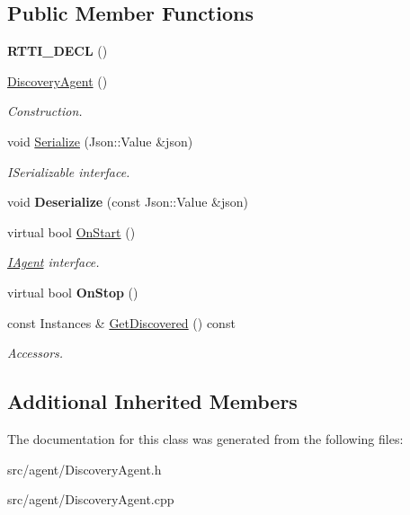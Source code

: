 \subsection*{Public Member Functions}
\begin{DoxyCompactItemize}
\item 
\mbox{\label{class_discovery_agent_a2588146e902e5d257ca271b069375f6b}} 
{\bfseries R\+T\+T\+I\+\_\+\+D\+E\+CL} ()
\item 
\mbox{\label{class_discovery_agent_a67363475dc274fd8b759f9a263077b24}} 
\hyperlink{class_discovery_agent_a67363475dc274fd8b759f9a263077b24}{Discovery\+Agent} ()
\begin{DoxyCompactList}\small\item\em Construction. \end{DoxyCompactList}\item 
\mbox{\label{class_discovery_agent_a50f62278b7937a8d6570def984a45f3e}} 
void \hyperlink{class_discovery_agent_a50f62278b7937a8d6570def984a45f3e}{Serialize} (Json\+::\+Value \&json)
\begin{DoxyCompactList}\small\item\em I\+Serializable interface. \end{DoxyCompactList}\item 
\mbox{\label{class_discovery_agent_a274bf13dc2c1710c2b5bad7adf761ab0}} 
void {\bfseries Deserialize} (const Json\+::\+Value \&json)
\item 
\mbox{\label{class_discovery_agent_a113c33de751fd40a24e416c0eb7e5a3e}} 
virtual bool \hyperlink{class_discovery_agent_a113c33de751fd40a24e416c0eb7e5a3e}{On\+Start} ()
\begin{DoxyCompactList}\small\item\em \hyperlink{class_i_agent}{I\+Agent} interface. \end{DoxyCompactList}\item 
\mbox{\label{class_discovery_agent_add71af911778441d2c032d4ad8ad6a86}} 
virtual bool {\bfseries On\+Stop} ()
\item 
\mbox{\label{class_discovery_agent_a677f2a9afb0f85709fdb83b9c57e3800}} 
const Instances \& \hyperlink{class_discovery_agent_a677f2a9afb0f85709fdb83b9c57e3800}{Get\+Discovered} () const
\begin{DoxyCompactList}\small\item\em Accessors. \end{DoxyCompactList}\end{DoxyCompactItemize}
\subsection*{Additional Inherited Members}


The documentation for this class was generated from the following files\+:\begin{DoxyCompactItemize}
\item 
src/agent/Discovery\+Agent.\+h\item 
src/agent/Discovery\+Agent.\+cpp\end{DoxyCompactItemize}
